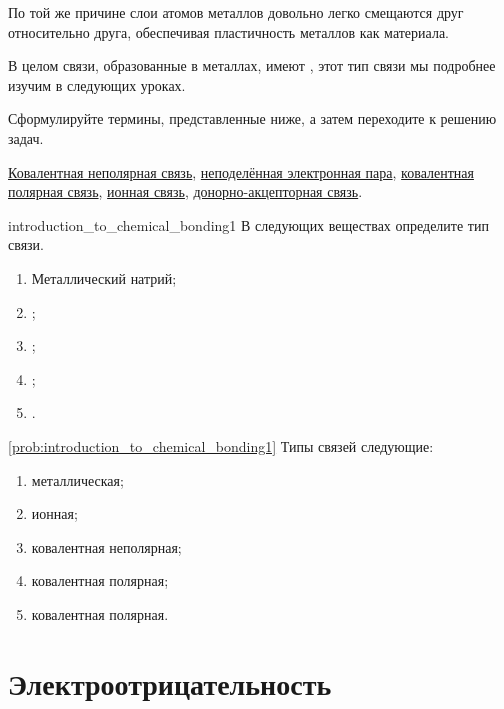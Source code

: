 По той же причине слои атомов металлов довольно легко смещаются друг относительно друга, обеспечивая пластичность металлов как материала.

В целом связи, образованные в металлах, имеют , этот тип связи мы подробнее изучим в следующих уроках.

Сформулируйте термины, представленные ниже, а затем переходите к решению задач.

\begin{termlist}
    \hyperref[term:non-polar_covalent_bond]{Ковалентная неполярная связь},
    \hyperref[term:lone_electron_pairs]{неподелённая электронная пара},
    \hyperref[term:polar_covalent_bond]{ковалентная полярная связь},
    \hyperref[term:ionic_bond]{ионная связь},
    \hyperref[term:coordinate_covalent_bond]{донорно-акцепторная связь}.
\end{termlist}

\begin{problem}{}{introduction_to_chemical_bonding1}
    В следующих веществах определите тип связи.
    \begin{enumerate}[label=\arabic*)]
        \item Металлический натрий;
        \item {};
        \item {};
        \item {};
        \item {}.
    \end{enumerate}
    \begin{sol}{\ref{prob:introduction_to_chemical_bonding1}}
        Типы связей следующие:
        \begin{enumerate}[label=\arabic*)]
        \item металлическая;
        \item ионная;
        \item ковалентная неполярная;
        \item ковалентная полярная;
        \item ковалентная полярная.
    \end{enumerate}
    \end{sol}
\end{problem}

\clearpage

\section{Электроотрицательность}\label{sec:electronegativity}

